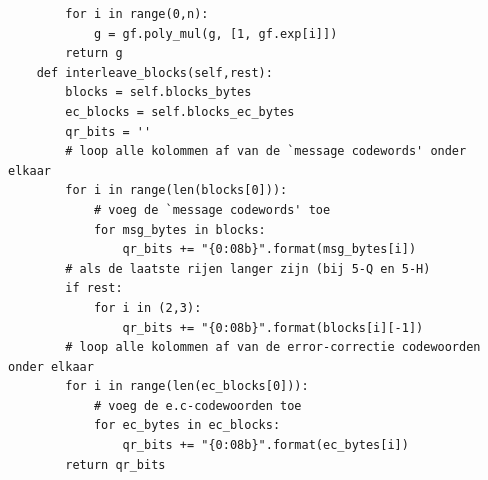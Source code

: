 \documentclass[a4paper]{article}
\begin{document}
\begin{verbatim}
        for i in range(0,n):
            g = gf.poly_mul(g, [1, gf.exp[i]])
        return g
    def interleave_blocks(self,rest):
        blocks = self.blocks_bytes
        ec_blocks = self.blocks_ec_bytes
        qr_bits = ''
        # loop alle kolommen af van de `message codewords' onder elkaar
        for i in range(len(blocks[0])):
            # voeg de `message codewords' toe
            for msg_bytes in blocks:
                qr_bits += "{0:08b}".format(msg_bytes[i])
        # als de laatste rijen langer zijn (bij 5-Q en 5-H)
        if rest:
            for i in (2,3):
                qr_bits += "{0:08b}".format(blocks[i][-1])
        # loop alle kolommen af van de error-correctie codewoorden onder elkaar
        for i in range(len(ec_blocks[0])):
            # voeg de e.c-codewoorden toe
            for ec_bytes in ec_blocks:
                qr_bits += "{0:08b}".format(ec_bytes[i])
        return qr_bits
\end{verbatim}
\end{document}
